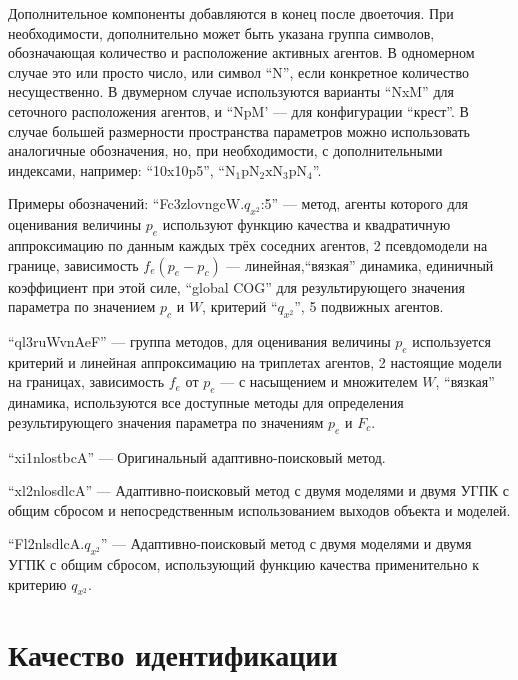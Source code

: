 Дополнительное компоненты добавляются в конец после двоеточия.
При необходимости, дополнительно может быть указана группа символов, обозначающая количество
и расположение активных агентов.
В одномерном случае это или просто число, или символ ``N'', если
конкретное количество несущественно. В двумерном случае
используются варианты ``NxM'' для сеточного расположения агентов,
и ``NpM'  --- для конфигурации ``крест''. В случае большей размерности
пространства параметров можно использовать аналогичные обозначения,
но, при необходимости, с дополнительными индексами, например:
``10x10p5'', ``$\mathrm{N_1 p N_2 x N_3 p N_4}$''.



Примеры обозначений:
``Fc3zlovngcW.$q_{x^2}$:5''
--- метод, агенты которого
для оценивания величины $p_e$ используют функцию качества и квадратичную аппроксимацию
по данным каждых трёх соседних агентов, 2 псевдомодели на границе,
зависимость $f_e(p_e-p_c)$ --- линейная,``вязкая'' динамика,
единичный коэффициент при этой силе,
``global COG'' для результирующего значения параметра по значением $p_c$ и $W$,
критерий ``$q_{x^2}$'', 5 подвижных агентов.


``ql3ruWvnAeF''
--- группа методов,
для оценивания величины $p_e$ используется критерий и линейная аппроксимацию на триплетах агентов,
2 настоящие модели на границах,
зависимость $f_e$ от $p_e$ --- с насыщением и множителем $W$, ``вязкая'' динамика,
используются все доступные методы для определения  результирующего значения параметра
по значениям $p_e$ и $F_c$.

``xi1nlostbcA'' --- Оригинальный адаптивно-поисковый метод.

``xl2nlosdlcA'' --- Адаптивно-поисковый метод с двумя моделями и двумя УГПК с общим сбросом
 и непосредственным использованием выходов объекта и моделей.

``Fl2nlsdlcA.$q_{x^2}$'' --- Адаптивно-поисковый метод с двумя моделями и двумя УГПК с общим сбросом,
 использующий функцию качества применительно к критерию $q_{x^2}$.





\section{Качество идентификации}  %


